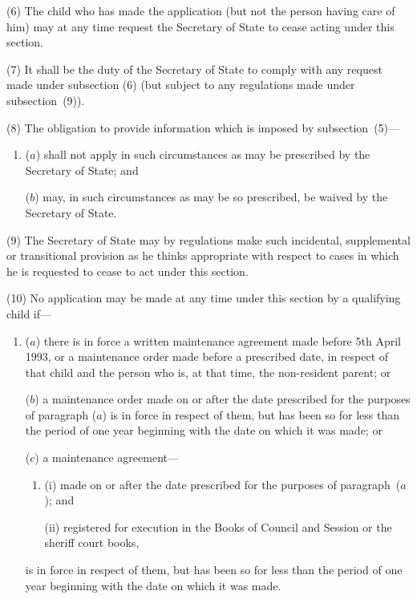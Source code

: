\documentclass[a4paper]{article}
\begin{document}
(6)
The child who has made the application (but not the person having care of him)
may at any time request the Secretary of State to cease acting under this section.

(7)
It shall be the duty of the Secretary of State to comply with any request made
under subsection (6) (but subject to any regulations made under subsection~(9)).

(8)
The obligation to provide information which is imposed by subsection~(5)---
\begin{enumerate}\item[]
($a$)
shall not apply in such circumstances as may be prescribed by the Secretary
of State; and

($b$)
may, in such circumstances as may be so prescribed, be waived by the
Secretary of State.
\end{enumerate}

(9)
The Secretary of State may by regulations make such incidental, supplemental
or transitional provision as he thinks appropriate with respect to cases
in which he is requested to cease to act under this section.

(10) No application may be made at any time under this section by a qualifying
child if---
\begin{enumerate}\item[]
($a$)
there is in force a written maintenance agreement made before 5th
April 1993, or a maintenance order made before a prescribed date, in
respect of that child and the person who is, at that time, the non-resident
parent; or

($b$)
a maintenance order made on or after the date prescribed for the purposes
of paragraph ($a$) is in force in respect of them, but has been so for less than
the period of one year beginning with the date on which it was made; or

($c$)
a maintenance agreement---
\begin{enumerate}\item[]
(i)
made on or after the date prescribed for the purposes of paragraph~($a$); and

(ii)
registered for execution in the Books of Council and Session or the
sheriff court books,
\end{enumerate}
is in force in respect of them, but has been so for less than the period of one year
beginning with the date on which it was made.
\end{enumerate}
\end{document}
